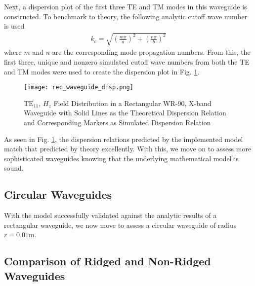 Next, a dispersion plot of the first three TE and TM modes in this waveguide is constructed. To benchmark to theory, the following analytic cutoff wave number is used
\begin{align}
    k_c=\sqrt{\left(\frac{m\pi}{a}\right)^2+\left(\frac{n\pi}{b}\right)^2}
\end{align}
where $m$ and $n$ are the corresponding mode propagation numbers. From this, the first three, unique and nonzero simulated cutoff wave numbers from both the TE and TM modes were used to create the dispersion plot in Fig. \ref{fig:rect_disp}.

\begin{figure}[h!]  
	\centering
	\texttt{[image: rec\_waveguide\_disp.png]} 
	\caption{$\mathrm{TE_{11}}$, $H_z$ Field Distribution in a Rectangular WR-90, X-band Waveguide with Solid Lines as the Theoretical Dispersion Relation and Corresponding Markers as Simulated Dispersion Relation}
	\label{fig:rect_disp}
\end{figure}

As seen in Fig. \ref{fig:rect_disp}, the dispersion relations predicted by the implemented model match that predicted by theory excellently. With this, we move on to assess more sophisticated waveguides knowing that the underlying mathematical model is sound.


\subsection{Circular Waveguides}
\label{subsec:circ_guides}
With the model successfully validated against the analytic results of a rectangular waveguide, we now move to assess a circular waveguide of radius $r=0.01$m. 

\subsection{Comparison of Ridged and Non-Ridged Waveguides}
\label{subsec:rid_guides}
